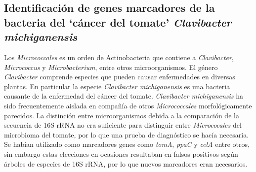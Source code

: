 \documentclass[12pt,twoside]{reedthesis}
\begin{document}
  \subsection{\texorpdfstring{Identificación de genes marcadores de la
  bacteria del `cáncer del tomate' \emph{Clavibacter
  michiganensis}}{Identificación de genes marcadores de la bacteria del cáncer del tomate Clavibacter michiganensis}}\label{identificacion-de-genes-marcadores-de-la-bacteria-del-cancer-del-tomate-clavibacter-michiganensis}
  
  Los \emph{Micrococcales} es un orden de Actinobacteria que contiene a
  \emph{Clavibacter}, \emph{Micrococcus} y \emph{Microbacterium}, entre
  otros microorganismos. El género \emph{Clavibacter} comprende especies
  que pueden causar enfermedades en diversas plantas. En particular la
  especie \emph{Clavibacter michiganensis} es una bacteria causante de la
  enfermedad del cáncer del tomate. \emph{Clavibacter michiganensis} ha
  sido frecuentemente aislada en compañía de otros \emph{Micrococcales}
  morfológicamente parecidos. La distinción entre microorganismos debida a
  la comparación de la secuencia de 16S rRNA no era suficiente para
  distinguir entre \emph{Micrococales} del microbioma del tomate, por lo
  que una prueba de diagnóstico se hacía necesaria. Se habían utilizado
  como marcadores genes como \emph{tomA}, \emph{ppaC} y \emph{celA} entre
  otros, sin embargo estas elecciones en ocasiones resultaban en falsos
  positivos según árboles de especies de 16S rRNA, por lo que nuevos
  marcadores eran necesarios.
  
\end{document}
